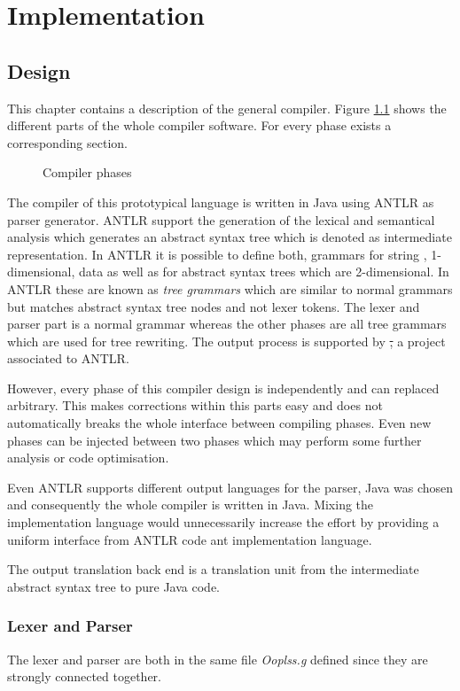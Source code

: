 \part{Implementation}
\chapter{Design}
This chapter contains a description of the general compiler. Figure
\ref{fig:compilerPhase} shows the different parts of the whole compiler
software. For every phase exists a corresponding section.

\begin{figure}[ht]
	\centerline{}
	\caption{Compiler phases}
	\label{fig:compilerPhase}
\end{figure}

The compiler of this prototypical language is written in Java using
ANTLR as parser generator. ANTLR support the generation of the lexical
and semantical analysis which generates an abstract syntax tree which
is denoted as intermediate representation. In ANTLR it is possible to
define both, grammars for string , 1-dimensional, data as well as for
abstract syntax trees which are 2-dimensional. In ANTLR these are known
as \emph{tree grammars} which are similar to normal grammars but matches
abstract syntax tree nodes and not lexer tokens. The lexer and parser
part is a normal grammar whereas the other phases are all tree grammars
which are used for tree rewriting. The output process is supported by
\st, a project associated to ANTLR.

However, every phase of this compiler design is independently and can 
replaced arbitrary. This makes corrections within this parts easy and
does not automatically breaks the whole interface between compiling
phases. Even new phases can be injected between two phases which may 
perform some further analysis or code optimisation.

Even ANTLR supports different output languages for the parser, Java was
chosen and consequently the whole compiler is written in Java. Mixing
the implementation language would unnecessarily increase the effort
by providing a uniform interface from ANTLR code ant implementation
language.

The output translation back end is a translation unit from the
intermediate abstract syntax tree to pure Java code.

\section{Lexer and Parser}
The lexer and parser are both in the same file \emph{Ooplss.g} defined
since they are strongly connected together. 

